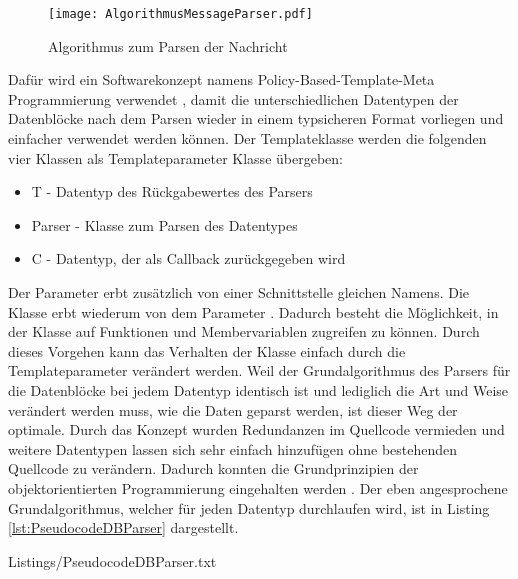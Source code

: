 \begin{figure}[H]
\centering
\texttt{[image: AlgorithmusMessageParser.pdf]}
\caption{Algorithmus zum Parsen der Nachricht}
\label{fig:AlgorithmusMessageParser}
\end{figure}

Daf{\"u}r wird ein Softwarekonzept namens Policy-Based-Template-Meta Programmierung
verwendet \cite{Alexandrescu:2001:MCD:377789}, damit die
unterschiedlichen Datentypen der Datenbl{\"o}cke nach dem Parsen wieder in einem
typsicheren Format vorliegen und einfacher verwendet werden k{\"o}nnen.
Der Templateklasse werden die folgenden vier Klassen als Templateparameter
Klasse {\"u}bergeben:

\begin{itemize}
\item T - Datentyp des R{\"u}ckgabewertes des Parsers
\item Parser - Klasse zum Parsen des Datentypes
\item C - Datentyp, der als Callback zur{\"u}ckgegeben wird
\end{itemize}

Der Parameter  erbt zus{\"a}tzlich von einer
Schnittstelle gleichen Namens. Die Klasse  erbt
wiederum von dem Parameter .
Dadurch besteht die M{\"o}glichkeit, in der Klasse auf Funktionen und
Membervariablen zugreifen zu k{\"o}nnen.
Durch dieses Vorgehen kann das Verhalten der Klasse einfach durch die
Templateparameter ver{\"a}ndert werden. Weil der Grundalgorithmus des Parsers
f{\"u}r die Datenbl{\"o}cke bei jedem Datentyp identisch ist und lediglich die
Art und Weise ver{\"a}ndert werden muss, wie die Daten geparst werden,
ist dieser Weg der optimale. Durch das Konzept wurden
Redundanzen im Quellcode vermieden und weitere Datentypen lassen sich
sehr einfach hinzuf{\"u}gen ohne bestehenden Quellcode zu ver{\"a}ndern. Dadurch konnten
die Grundprinzipien der objektorientierten Programmierung eingehalten werden \cite{herold2001go}.
Der eben angesprochene Grundalgorithmus, welcher f{\"u}r jeden Datentyp
durchlaufen wird, ist in Listing \ref{lst:PseudocodeDBParser} dargestellt.

\lstset{language=pseudo}
\lstset{commentstyle=\textit}
{Listings/PseudocodeDBParser.txt}
